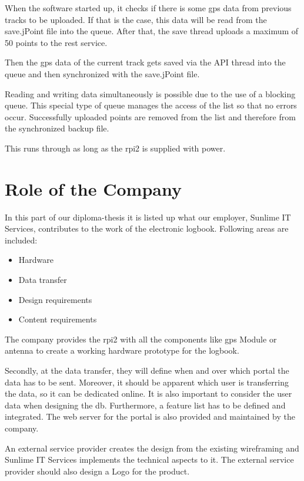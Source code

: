 When the software started up, it checks if there is some \gls{gps} data from previous tracks to be uploaded. If that is the case, this data will be read from the save.jPoint file into the queue. After that, the save thread uploads a maximum of 50 points to the \gls{rest} service. 


Then the \gls{gps} data of the current track gets saved via the API thread into the queue and then synchronized with the save.jPoint file.

Reading and writing data simultaneously is possible due to the use of a blocking queue. This special type of queue manages the access of the list so that no errors occur.\newline
Successfully uploaded points are removed from the list and therefore from the synchronized backup file.

This runs through as long as the \gls{rpi2} is supplied with power.
\clearpageauthor

\newpage
\section*{Role of the Company}
In this part of our diploma-thesis it is listed up what our employer, Sunlime IT Services, contributes to the work of the electronic logbook. Following areas are included:
\begin{itemize}
\item Hardware
\item Data transfer
\item Design requirements
\item Content requirements
\end{itemize}
The company provides the \gls{rpi2} with all the components like \gls{gps} Module or antenna to create a working hardware prototype for the logbook.

Secondly, at the data transfer, they will define when and over which portal the data has to be sent. Moreover, it should be apparent which user is transferring the data, so it can be dedicated online. It is also important to consider the user data when designing the \gls{db}. Furthermore, a feature list has to be defined and integrated.
The web server for the portal is also provided and maintained by the company.

An external service provider creates the design from the existing wireframing and Sunlime IT Services implements the technical aspects to it. The external service provider should also design a Logo for the product.

